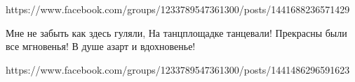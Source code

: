  
 
 
 
 

https://www.facebook.com/groups/1233789547361300/posts/1441688236571429

Мне не забыть как здесь гуляли,
На танцплощадке танцевали!
Прекрасны были все мгновенья!
В душе азарт и вдохновенье!

https://www.facebook.com/groups/1233789547361300/posts/1441486296591623
